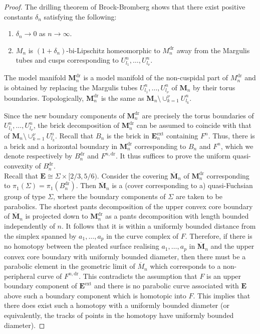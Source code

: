 \documentclass{amsart}
\theoremstyle{definition}
\begin{document}
\begin{proof}
 The drilling theorem of Brock-Bromberg \cite{BB} shows that there exist positive constants $\delta_n$
 satisfying the following:
 
 \begin{enumerate}
 \item $\delta_n \to 0$ as $n \to \infty$.
 \item $M_n$ is $(1+\delta_n)$-bi-Lipschitz homeomorphic to  ${M}_n^\mathrm{dr}$ away from the Margulis tubes and cusps corresponding to $U^n_{l_1}, \dots, U^n_{l_\nu}$.
 \end{enumerate} 
The  model manifold ${\mathbf M}_n^\mathrm{dr}$ is a model manifold of the non-cuspidal part of $M_n^\mathrm{dr}$ and is obtained by replacing the Margulis tubes $U^n_{l_1}, \dots, U^n_{l_\nu}$ of $\mathbf M_n$ by their torus boundaries.
Topologically,  ${\mathbf M}_n^\mathrm{dr}$ is the same as $\mathbf M_n \setminus \cup_{k=1}^\nu U^n_{l_k}$.

Since the new boundary components of ${\mathbf M}_n^\mathrm{dr}$ are precisely the torus boundaries 
of $U^n_{l_1}, \dots , U^n_{l_\nu}$, the brick decomposition of ${\mathbf M}_n^\mathrm{dr}$ can be assumed to coincide with that of $\mathbf M_n \setminus \cup_{k=1}^\nu U^n_{l_k}$. Recall that
$B_n$ is the brick in $\mathbf E^\mathrm{ext}_n$ containing $F^n$.
Thus, there is a brick and a horizontal boundary in ${\mathbf M}_n^\mathrm{dr}$ corresponding to $B_n$ and $F^n$, which we denote respectively by ${B}_n^\mathrm{dr}$ and ${F}^{n,\mathrm{dr}}$.
It thus suffices  to prove the uniform quasi-convexity of ${B}_n^\mathrm{dr}$.\\


Recall that $\mathbf E \cong \Sigma \times [2/3,5/6)$.
Consider the covering $\overline{\mathbf M}_n$ of ${\mathbf M}_n^\mathrm{dr}$ corresponding to $\pi_1(\Sigma)=\pi_1({B}_n^\mathrm{dr})$.
Then  $\overline{\mathbf M}_n$  is a (cover corresponding to a) quasi-Fuchsian group of  type $\Sigma$, where the boundary components of $\Sigma$ are taken to be parabolics.
The shortest pants decomposition of the upper convex core boundary of $\overline{\mathbf M}_n$  is projected down to ${\mathbf M}_n^\mathrm{dr}$ as a pants decomposition with length bounded independently of $n$.
It follows that it is within a uniformly bounded distance from the simplex spanned by $a_1, \dots , a_p$ in the curve complex of $F$.
Therefore, if there is no homotopy between the pleated surface realising $a_1, \dots , a_p$ in $\overline{\mathbf M}_n$ and the upper convex core boundary with uniformly bounded diameter,  then there must be a parabolic element in the geometric limit of $\overline M_n$ which corresponds to a non-peripheral curve of ${F}^{n,\mathrm{dr}}$.
This contradicts the assumption that $F$ is an upper boundary component of $\mathbf E^\mathrm{ext}$ and there is no parabolic curve associated with $\mathbf E$ above such a boundary component which is homotopic into $F$.
This implies that there does exist such a homotopy with a uniformly bounded diameter (or equivalently, the tracks of points in the homotopy have  uniformly bounded diameter).


\end{proof}
\end{document}
